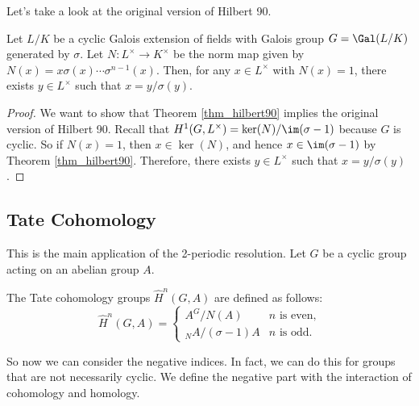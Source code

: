 Let's take a look at the original version of Hilbert 90.
\begin{theorem}
    Let $L/K$ be a cyclic Galois extension of fields with Galois group $G = \Gal(L/K)$ generated by $\sigma$.
    Let $N: L^\times \to K^\times$ be the norm map given by $N(x) = x\sigma(x)\cdots \sigma^{n-1}(x)$.
    Then, for any $x \in L^\times$ with $N(x) = 1$, there exists $y \in L^\times$ such that $x = y/\sigma(y)$.
\end{theorem}
\begin{proof}
    We want to show that Theorem \ref{thm_hilbert90} implies the original version of Hilbert 90.
    Recall that $H^1(G, L^\times) = \ker(N)/\im(\sigma-1)$ because $G$ is cyclic.
    So if $N(x) = 1$, then $x \in \ker(N)$, and hence $x \in \im(\sigma-1)$ by Theorem \ref{thm_hilbert90}.
    Therefore, there exists $y \in L^\times$ such that $x = y/\sigma(y)$.
\end{proof}

\subsection{Tate Cohomology}
This is the main application of the 2-periodic resolution.
Let $G$ be a cyclic group acting on an abelian group $A$.

\begin{definition}
    The Tate cohomology groups $\hat{H}^n(G, A)$ are defined as follows:
    \[
        \hat{H}^n(G, A) = \begin{cases}
            A^G/N(A) & n \text{ is even,}\\
            {}_N A/(\sigma-1)A & n \text{ is odd.}
        \end{cases}
    \]
\end{definition}

So now we can consider the negative indices.
In fact, we can do this for groups that are not necessarily cyclic.
We define the negative part with the interaction of cohomology and homology.